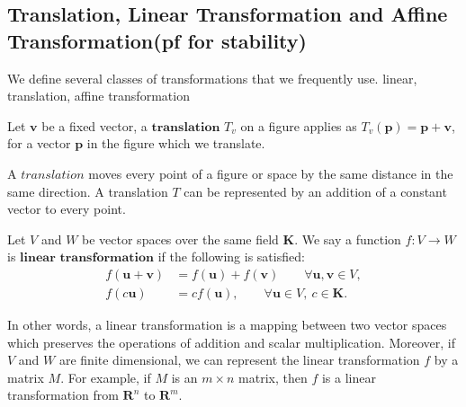    \subsection{Translation, Linear Transformation and Affine Transformation(pf for stability)}
      
      We define several classes of transformations that we frequently use.
      linear, translation, affine transformation\\
      
      \begin{definition*}
         Let $\textbf{v}$ be a fixed vector, a $\textbf{translation}$ ${T}_v$ on a figure applies as ${T}_v (\textbf{p}) = \textbf{p} + \textbf{v}$, for a vector $\textbf{p}$ in the figure which we translate.
      \end{definition*}
      A $\textit{translation}$ moves every point of a figure or space by the same distance in the same direction. A translation ${T}$ can be represented by an addition of a constant vector to every point.\\


      \begin{definition*}
      Let ${V}$ and ${W}$ be vector spaces over the same field $\textbf{K}$. We say a function $\mathit{f}: {V} \rightarrow {W}$ is $\textbf{linear transformation}$ if the following is satisfied:\\
      \begin{align*}
      \mathit{f}(\textbf{u} + \textbf{v}) &= \mathit{f}(\textbf{u}) + \mathit{f}(\textbf{v}) \qquad \forall \textbf{u}, \textbf{v} \in{V},\\
      \mathit{f}(c\textbf{u}) &= c\mathit{f}(\textbf{u}), \qquad \forall \textbf{u} \in{V}, ~c\in\textbf{K}.
      \end{align*}
      \end{definition*}
      In other words, a linear transformation is a mapping between two vector spaces which preserves the operations of addition and scalar multiplication. Moreover, if ${V}$ and ${W}$ are finite dimensional, we can represent the linear transformation ${f}$ by a matrix ${M}$. For example, if ${M}$ is an ${m} \times {n}$ matrix, then ${f}$ is a linear transformation from $\mathbf{R}^n$ to $\mathbf{R}^m$. \\


